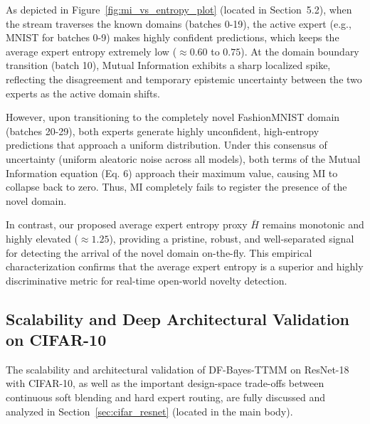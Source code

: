 \documentclass{article}
\theoremstyle{plain}
\theoremstyle{definition}
\theoremstyle{remark}
\begin{document}
As depicted in Figure~\ref{fig:mi_vs_entropy_plot} (located in Section~5.2), when the stream
traverses the known domains (batches 0-19), the active expert (e.g., MNIST for batches 0-9) makes
highly confident predictions, which keeps the average expert entropy extremely low ($\approx 0.60$
to $0.75$). At the domain boundary transition (batch 10), Mutual Information exhibits a sharp
localized spike, reflecting the disagreement and temporary epistemic uncertainty between the two
experts as the active domain shifts.

However, upon transitioning to the completely novel FashionMNIST domain (batches 20-29), both
experts generate highly unconfident, high-entropy predictions that approach a uniform distribution.
Under this consensus of uncertainty (uniform aleatoric noise across all models), both terms of the
Mutual Information equation (Eq. 6) approach their maximum value, causing MI to collapse back to
zero. Thus, MI completely fails to register the presence of the novel domain.

In contrast, our proposed average expert entropy proxy $\bar{H}$ remains monotonic and highly
elevated ($\approx 1.25$), providing a pristine, robust, and well-separated signal for detecting the
arrival of the novel domain on-the-fly. This empirical characterization confirms that the average
expert entropy is a superior and highly discriminative metric for real-time open-world novelty
detection.

\subsection{Scalability and Deep Architectural Validation on CIFAR-10}
\label{sec:appendix_cifar}
The scalability and architectural validation of DF-Bayes-TTMM on ResNet-18 with CIFAR-10, as well as the important design-space trade-offs between continuous soft blending and hard expert routing, are fully discussed and analyzed in Section~\ref{sec:cifar_resnet} (located in the main body).
\end{document}
